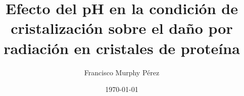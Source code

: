 \documentclass[
	a4paper, %
	fontsize=10pt, %
    twoside=true, %
	numbers=noenddot, %
]{kaobook}
\begin{document}

\titlehead{Lolo}
\subject{Lola}

\title[Efecto del pH en el daño por radiación]{Efecto del pH en la condición de cristalización sobre el daño por radiación en cristales de proteína}

\author[FMP]{Francisco Murphy Pérez}

\date{\today}



\frontmatter %




\makeatletter
\end{document}
